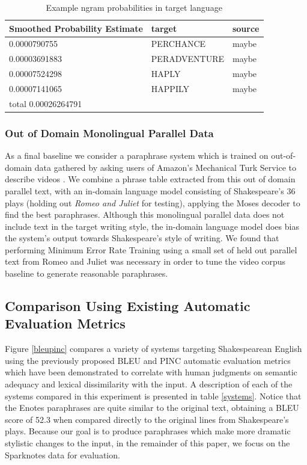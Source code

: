 \documentclass[10pt,a5paper,twoside]{article}
\begin{document}
\begin{table}
  \begin{center}
  \begin{tabular}{|l|l|l|}
    \hline
    Smoothed Probability Estimate & target & source \\
    \hline
    \hline
    0.0000790755 & PERCHANCE & maybe \\
    \hline
    0.00003691883 & PERADVENTURE & maybe \\
    \hline
    0.00007524298 & HAPLY & maybe \\
    \hline
    0.00007141065 & HAPPILY & maybe \\
    \hline
    \hline
    total 0.00026264791 & & \\
    \hline
  \end{tabular}
  \end{center}
  \caption{Example ngram probabilities in target language}
  \label{word_frequency}
\end{table}

\subsubsection{Out of Domain Monolingual Parallel Data}
\label{video_baseline}
As a final baseline we consider a paraphrase system which is trained on out-of-domain data gathered by asking users of Amazon's Mechanical Turk Service 
\cite{Snow08} to describe videos \cite{chen11}.  We combine a phrase table extracted from this out of domain parallel text, with an in-domain
language model consisting of Shakespeare's 36 plays (holding out {\em Romeo and Juliet} for testing), applying the Moses decoder \cite{Koehn07} to find the best paraphrases. 
Although this monolingual parallel data does not include text in the target writing style,
the in-domain language model does bias the system's output towards Shakespeare's style of writing.
We found that performing Minimum Error Rate Training using a small set of held out parallel text from Romeo and Juliet was necessary in order to tune the
video corpus baseline to generate reasonable paraphrases.

\subsection{Comparison Using Existing Automatic Evaluation Metrics}
Figure \ref{bleupinc} compares a variety of systems targeting Shakespearean English using the previously proposed BLEU \cite{Papineni02} and PINC \cite{chen11} automatic evaluation metrics which
have been demonstrated to correlate with human judgments on semantic adequacy and lexical dissimilarity with the input.
A description of each of the systems compared in this experiment is presented in table \ref{systems}.  Notice that the Enotes paraphrases are quite similar to the original text,
obtaining a BLEU score of 52.3 when compared directly to the original lines from Shakespeare's plays.  Because our goal is to produce paraphrases which make more dramatic stylistic changes to the input,
in the remainder of this paper, we focus on the Sparknotes data for evaluation.
\end{document}
